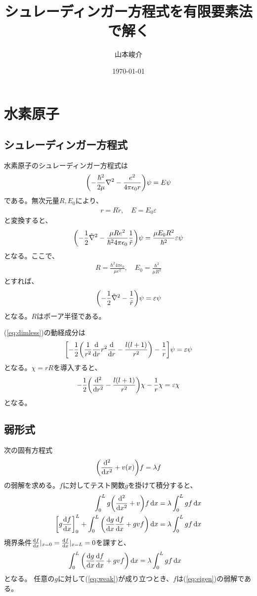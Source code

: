 \documentclass[xelatex,ja=standard]{bxjsarticle}
\title{シュレーディンガー方程式を有限要素法で解く}
\author{山本峻介}
\date{\today}
\begin{document}
\maketitle

\section{水素原子}
\subsection{シュレーディンガー方程式}
水素原子のシュレーディンガー方程式は
\begin{align}
    \qty(-\frac{\hbar^2}{2\mu}\nabla^2 -\frac{e^2}{4\pi\epsilon_0 r})\psi = E\psi
\end{align}
である。無次元量$R, E_0$により、
\begin{align}
    r = R\tilde{r},\quad E = E_0\varepsilon
\end{align}
と変換すると、
\begin{align}
    \qty(-\frac{1}{2}\tilde\nabla^2 - \frac{\mu R e^2}{\hbar^2 4\pi\epsilon_0}\frac{1}{\tilde r})\psi = \frac{\mu E_0R^2}{\hbar^2}\varepsilon\psi
\end{align}
となる。ここで、
\begin{align}
    R = \frac{\hbar^2 4\pi\epsilon_0}{\mu e^2}, \quad E_0 = \frac{\hbar^2}{\mu R^2}
\end{align}
とすれば、
\begin{align}
    \qty(-\frac{1}{2}\tilde\nabla^2 - \frac{1}{\tilde r})\psi = \varepsilon\psi\label{eq:dimless}
\end{align}
となる。$R$はボーア半径である。

(\ref{eq:dimless})の動経成分は
\begin{align}
    \qty[-\frac{1}{2}\qty(\frac{1}{r^2}\dv{r}r^2\dv{r} - \frac{l(l+1)}{r^2})
     - \frac{1}{r}]\psi = \varepsilon\psi
\end{align}
となる。$\chi = rR$を導入すると、
\begin{align}
    -\frac{1}{2}\qty(\dv[2]{r} - \frac{l(l+1)}{r^2})\chi - \frac{1}{r}\chi = \varepsilon\chi
\end{align}
となる。 

\subsection{弱形式}
次の固有方程式
\begin{align}
    \qty(\dv[2]{x} + v(x))f = \lambda f\label{eq:eigen}
\end{align}
の弱解を求める。$f$に対してテスト関数$g$を掛けて積分すると、
\begin{align}
    \int_0^Lg\qty(\dv[2]{x} + v)f\dd{x} &= \lambda\int_0^Lgf\dd{x}\notag\\
    \qty[g\dv{f}{x}]_0^L+\int_0^L\qty(\dv{g}{x}\dv{f}{x} + gvf)\dd{x}
     &= \lambda\int_0^Lgf\dd{x}
\end{align}
境界条件$\dv{f}{x}|_{x=0} = \dv{f}{x}|_{x=L} = 0$を課すと、
\begin{align}
    \int_0^L\qty(\dv{g}{x}\dv{f}{x} + gvf)\dd{x}
     &= \lambda\int_0^Lgf\dd{x}\label{eq:weak}
\end{align}
となる。  任意の$g$に対して(\ref{eq:weak})が成り立つとき、$f$は(\ref{eq:eigen})の弱解である。
\end{document}
